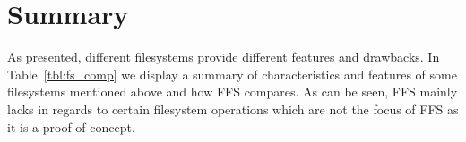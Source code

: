 
\section{Summary} %



As presented, different filesystems provide different features and drawbacks. 
In Table~\ref{tbl:fs_comp} we display a summary of characteristics and features 
of some filesystems mentioned above and how FFS compares. As can be seen, FFS 
mainly lacks in regards to certain filesystem operations which are not the focus of
FFS as it is a proof of concept. 

